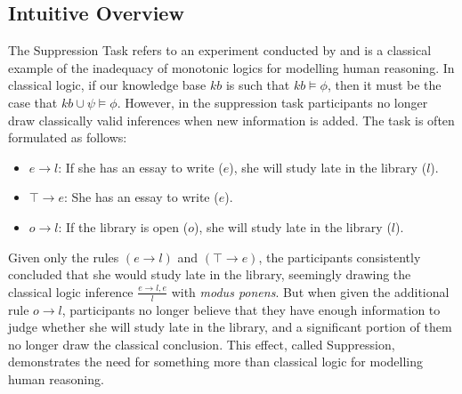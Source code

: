 \documentclass[
11pt, %
english, %
singlespacing, %
headsepline, %
]{MastersDoctoralThesis} %
\begin{document}
\subsection{Intuitive Overview} \label{ssec:sup_intuition}
The Suppression Task refers to an experiment conducted by \cite{byrne1989suppressing} and is a classical example of the inadequacy of monotonic logics for modelling human reasoning. In classical logic, if our knowledge base $kb$ is such that $kb \models \phi$, then it must be the case that $kb \cup \psi \models \phi$. However, in the suppression task participants no longer draw classically valid inferences when new information is added. The task is often formulated as follows:

\begin{itemize}
\item $e \rightarrow l$: If she has an essay to write ($e$), she will study late in the library ($l$).
\item $\top \rightarrow e$: She has an essay to write ($e$).
\item $o\rightarrow l$: If the library is open ($o$), she will study late in the library ($l$).
\end{itemize}

Given only the rules $(e \rightarrow l)$ and $(\top \rightarrow e)$, the participants consistently concluded that she would study late in the library, seemingly drawing the classical logic inference $\frac{e \rightarrow l, e}{l}$ with \textit{modus ponens}. But when given the additional rule $o\rightarrow l$, participants no longer believe that they have enough information to judge whether she will study late in the library, and a significant portion of them no longer draw the classical conclusion. This effect, called Suppression, demonstrates the need for something more than classical logic for modelling human reasoning.
\end{document}
